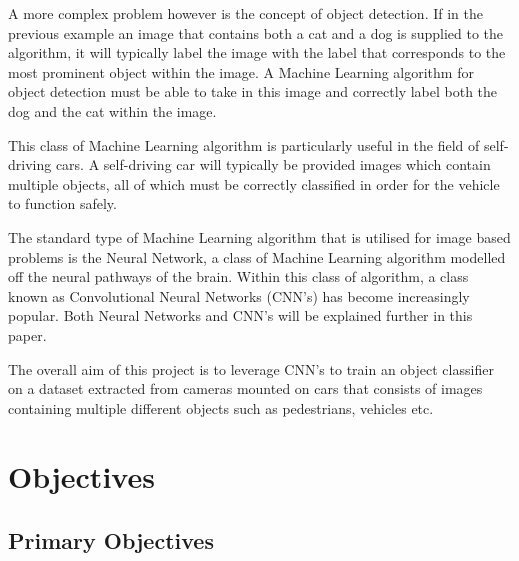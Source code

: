 \documentclass[12pt]{report}
\begin{document}
\begin{flushleft}
A more complex problem however is the concept of object detection. If in the previous example an image that contains both a cat and a dog is supplied to the algorithm, it will typically label the image with the label that corresponds to the most prominent object within the image. A Machine Learning algorithm for object detection must be able to take in this image and correctly label both the dog and the cat within the image.
\end{flushleft}

\begin{flushleft}
This class of Machine Learning algorithm is particularly useful in the field of self-driving cars. A self-driving car will typically be provided images which contain multiple objects, all of which must be correctly classified in order for the vehicle to function safely.
\end{flushleft}

\begin{flushleft}
The standard type of Machine Learning algorithm that is utilised for image based problems is the Neural Network, a class of Machine Learning algorithm modelled off the neural pathways of the brain. Within this class of algorithm, a class known as Convolutional Neural Networks (CNN's) has become increasingly popular. Both Neural Networks and CNN's will be explained further in this paper.
\end{flushleft}

\begin{flushleft}
The overall aim of this project is to leverage CNN's to train an object classifier on a dataset extracted from cameras mounted on cars that consists of images containing multiple different objects such as pedestrians, vehicles etc.
\end{flushleft}

\section{Objectives}
\vspace{0.5cm}
\subsection{Primary Objectives}
\end{document}
